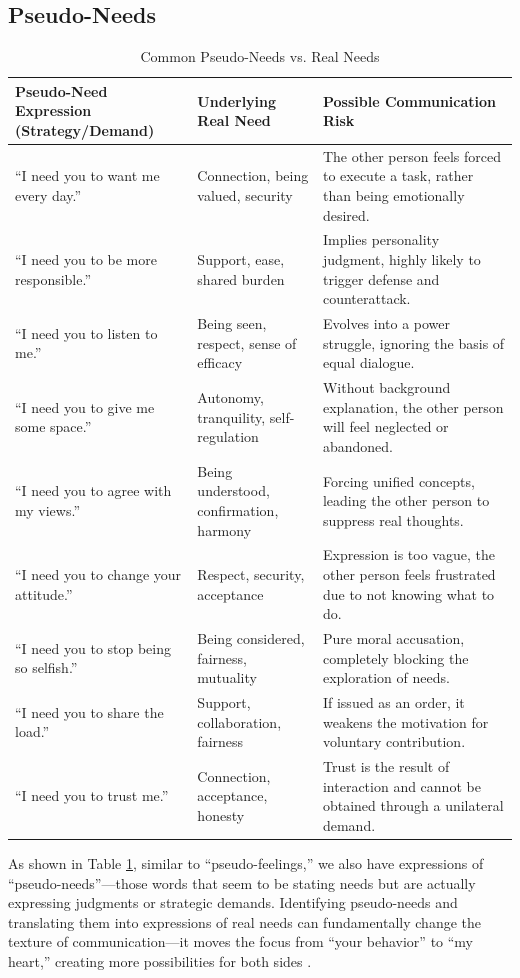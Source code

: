 \subsection{Pseudo-Needs}
\begin{table}[h]
\centering
\caption{Common Pseudo-Needs vs. Real Needs}
\label{tab:pseudo_needs}
\begin{tabular}{|p{4.5cm}|p{3.5cm}|p{6.5cm}|}
\hline
\textbf{Pseudo-Need Expression (Strategy/Demand)} & \textbf{Underlying Real Need} & \textbf{Possible Communication Risk} \\ \hline
``I need you to want me every day.'' & Connection, being valued, security & The other person feels forced to execute a task, rather than being emotionally desired. \\ \hline
``I need you to be more responsible.'' & Support, ease, shared burden & Implies personality judgment, highly likely to trigger defense and counterattack. \\ \hline
``I need you to listen to me.'' & Being seen, respect, sense of efficacy & Evolves into a power struggle, ignoring the basis of equal dialogue. \\ \hline
``I need you to give me some space.'' & Autonomy, tranquility, self-regulation & Without background explanation, the other person will feel neglected or abandoned. \\ \hline
``I need you to agree with my views.'' & Being understood, confirmation, harmony & Forcing unified concepts, leading the other person to suppress real thoughts. \\ \hline
``I need you to change your attitude.'' & Respect, security, acceptance & Expression is too vague, the other person feels frustrated due to not knowing what to do. \\ \hline
``I need you to stop being so selfish.'' & Being considered, fairness, mutuality & Pure moral accusation, completely blocking the exploration of needs. \\ \hline
``I need you to share the load.'' & Support, collaboration, fairness & If issued as an order, it weakens the motivation for voluntary contribution. \\ \hline
``I need you to trust me.'' & Connection, acceptance, honesty & Trust is the result of interaction and cannot be obtained through a unilateral demand. \\ \hline
\end{tabular}
\end{table}

As shown in Table \ref{tab:pseudo_needs}, similar to ``pseudo-feelings,''
we also have expressions of ``pseudo-needs''---those words that seem to be
stating needs but are actually expressing judgments or strategic demands.
Identifying pseudo-needs and translating them into expressions of real
needs can fundamentally change the texture of communication---it moves the
focus from ``your behavior'' to ``my heart,'' creating more possibilities
for both sides \citep{siegel2011}.

